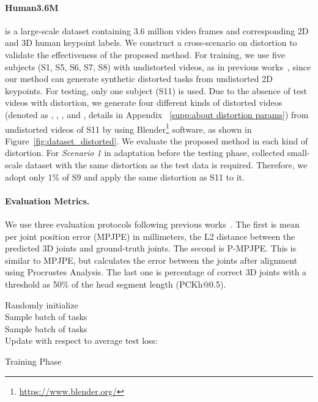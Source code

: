    \paragraph{Human3.6M~\cite{ref19_6682899}} is a large-scale dataset containing 3.6 million video frames and corresponding 2D and 3D human keypoint labels. We construct a cross-scenario on distortion to validate the effectiveness of the proposed method. For training, we use five subjects (S1, S5, S6, S7, S8) with undistorted videos, as in previous works~\cite{ref9_pavllo20193d,ref11_anatomy3D}, since our method can generate synthetic distorted tasks from undistorted 2D keypoints. For testing, only one subject (S11) is used. Due to the absence of test videos with distortion, we generate four different kinds of distorted videos (denoted as , , , and , details in Appendix ~\ref{supp:about distortion params}) from undistorted videos of S11 by using Blender\footnote{\url{https://www.blender.org/}} software, as shown in Figure~\ref{fig:dataset_distorted}. We evaluate the proposed method in each kind of distortion. For \textit{Scenario 1} in adaptation before the testing phase, collected small-scale dataset with the same distortion as the test data is required. Therefore, we adopt only 1\% of S9 and apply the same distortion as S11 to it.
    \vspace{-3mm}
    
    \paragraph{Evaluation Metrics.}
        We use three evaluation protocols following previous works~\cite{ref7_martinez2017simple,ref8_zhao2019semantic,ref9_pavllo20193d,ref11_anatomy3D,ref12_liu2020attention,ref18_ISO_NeurIPS2020}. The first is mean per joint position error (MPJPE) in millimeters, the L2 distance between the predicted 3D joints and ground-truth joints. The second is P-MPJPE. This is similar to MPJPE, but calculates the error between the joints after alignment using Procrustes Analysis. The last one is percentage of correct 3D joints with a threshold as 50\% of the head segment length (PCKh@0.5).

    \begin{algorithm}[t]
    	\DontPrintSemicolon
    	\SetAlgoLined
    	Randomly initialize \\
    	{
    	    Sample batch of tasks \\
    	}
    	{
    		Sample batch of tasks \\
    		Update  with respect to average test loss:\\
    		
    		
    	}
    	\caption{Training Phase}
    	\label{alg:1}
    \end{algorithm}

